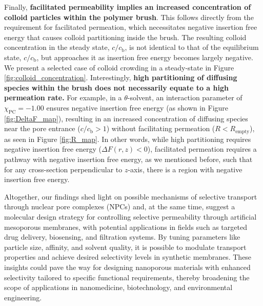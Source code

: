 \documentclass[12pt, a4paper]{article}
\begin{document}
Finally, \textbf{facilitated permeability implies an increased concentration of colloid particles within the polymer brush}.
This follows directly from the requirement for facilitated permeation, which necessitates negative insertion free energy that causes colloid partitioning inside the brush.
The resulting colloid concentration in the steady state, $c/c_{\text{b}}$, is not identical to that of the equilibrium state, $c/c_{\text{b}}$, but approaches it as insertion free energy becomes largely negative.
We present a selected case of colloid crowding in a steady-state in Figure \ref{fig:colloid_concentration}.
Interestingly, \textbf{high partitioning of diffusing species within the brush does not necessarily equate to a high permeation rate.}
For example, in a $\theta$-solvent, an interaction parameter of $\chi_{\text{PC}} = -1.00$ ensures negative insertion free energy (as shown in Figure \ref{fig:DeltaF_map}), resulting in an increased concentration of diffusing species near the pore entrance ($c/c_{\text{b}} > 1$) without facilitating permeation ($R < R_{\text{empty}}$), as seen in Figure \ref{fig:R_map}.
In other words, while high partitioning requires negative insertion free energy ($\Delta F(r,z) < 0$), facilitated permeation requires a pathway with negative insertion free energy, as we mentioned before, such that for any cross-section perpendicular to $z$-axis, there is a region with negative insertion free energy.




Altogether, our findings shed light on possible mechanisms of selective transport through nuclear pore complexes (NPCs) and, at the same time, suggest a molecular design strategy for controlling selective permeability through artificial mesoporous membranes, with potential applications in fields such as targeted drug delivery, biosensing, and filtration systems.
By tuning parameters like particle size, affinity, and solvent quality, it is possible to modulate transport properties and achieve desired selectivity levels in synthetic membranes.
These insights could pave the way for designing nanoporous materials with enhanced selectivity tailored to specific functional requirements, thereby broadening the scope of applications in nanomedicine, biotechnology, and environmental engineering.


\printbibliography
\end{document}
